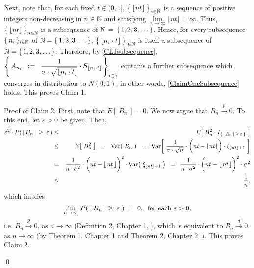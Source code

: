 \begin{enumerate}
\begin{equation}
		\end{equation}
		Next, note that, for each fixed
		$t \in (0,1]$, $\left\{\,\lfloor \overset{{\color{white}~}}{nt} \rfloor\,\right\}_{n\in\N}$
		is a sequence of positive integers non-decreasing in $n \in \mathbb{N}$ and
		satisfying $\underset{n\rightarrow\infty}{\lim}\lfloor nt \rfloor = \infty$.
		Thus, $\left\{\,\lfloor \overset{{\color{white}~}}{nt} \rfloor\,\right\}_{n\in\N}$ is a
		subsequence of $\mathbb{N} \,=\, \left\{\,1,2,3,\ldots\,\right\}$.
		Hence, for every subsequence $\{\,n_{i}\,\}_{i\in\mathbb{N}}$ of $\mathbb{N} = \{\,1,2,3,\ldots\,\}$,
		$\left\{\,\lfloor \overset{{\color{white}~}}{n_{i}\cdot t} \rfloor\,\right\}_{i\in\N}$
		is itself a subsequence of $\mathbb{N} = \{\,1,2,3,\ldots\,\}$.
		Therefore, by \eqref{CLTsubsequence},
		$
		\left\{\,
		A_{n_{i}}
		\;\; := \;\;
		\dfrac{1}{\sigma\cdot\sqrt{\lfloor n_{i}\cdot t \rfloor}}
		\cdot
		S_{\lfloor n_{i}\cdot t \rfloor}
		\,\right\}_{i \in \mathbb{N}}
		$
		contains a further subsequence which converges in distribution to $N(0,1)$;
		in other words, \eqref{ClaimOneSubsequence} holds.
		This proves Claim 1.
		
		\vskip 0.5cm
		\noindent
		\underline{Proof of Claim 2:}\quad
		First, note that $E\!\left[\;B_{n}\;\right] = 0$.
		We now argue that $B_{n} \overset{p}{\longrightarrow} 0$.
		To this end, let $\varepsilon > 0$ be given.
		Then,
		\begin{eqnarray*}
		\varepsilon^{2} \cdot P\!\left(\,\vert\,B_{n}\,\vert\,\geq\,\varepsilon\,\right)
		&\leq& E\!\left[\;B^{2}_{n} \cdot I_{\{\,\vert\,B_{n}\,\vert\,\geq\,\varepsilon\,\}}\;\right]
		\\
		&\leq& E\!\left[\;B_{n}^{2}\;\right]
		\;\;=\;\; \Var\!\left(\;B_{n}\;\right)
		\;\;=\;\;
			\Var\!\left[\;
				\dfrac{1}{\sigma\cdot\sqrt{n}}
				\cdot
				\left(\overset{{\color{white}1}}{nt} - \lfloor nt \rfloor\right)
				\cdot
				\xi_{\lfloor nt \rfloor + 1}
			\;\right]
		\\
		&=&
			\dfrac{1}{n\cdot\sigma^{2}}
			\cdot
			\left(\overset{{\color{white}1}}{nt} - \lfloor\,nt\,\rfloor\right)^{2}
			\cdot
			\Var\!\left(\;\xi_{\lfloor nt \rfloor + 1}\;\right)
		\;\;=\;\;
			\dfrac{1}{n\cdot\sigma^{2}}
			\cdot
			\left(\overset{{\color{white}1}}{nt} - \lfloor\,nt\,\rfloor\right)^{2}
			\cdot
			\sigma^{2}
		\\
		&\leq& \dfrac{1}{n},
		\end{eqnarray*}
		which implies
		\begin{equation*}
		\lim_{n\rightarrow\infty}\,P\!\left(\;\vert\,B_{n}\,\vert\,\geq\,\varepsilon\;\right) \; = \; 0,
		\;\;
		\textnormal{for each $\varepsilon > 0$},
		\end{equation*}
		i.e. $B_{n}\overset{p}{\longrightarrow}0$, as $n\longrightarrow\infty$
		(Definition 2, Chapter 1, \cite{Ferguson1996}),
		which is equivalent to $B_{n}\overset{d}{\longrightarrow}0$, as $n\longrightarrow\infty$
		(by Theorem 1, Chapter 1 and Theorem 2, Chapter 2, \cite{Ferguson1996}).
		This proves Claim 2.

\end{enumerate}
\qed

